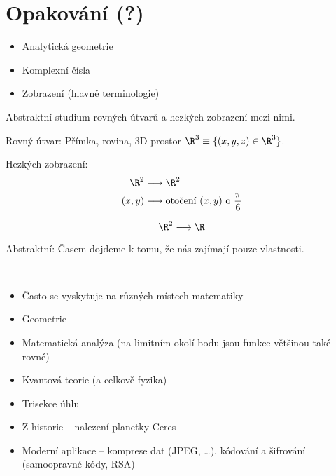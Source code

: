 \documentclass[12pt]{article}					%
\begin{document}
\section{Opakování (?)}
    \begin{itemize}
        \item Analytická geometrie
        \item Komplexní čísla
        \item Zobrazení (hlavně terminologie)
    \end{itemize}
    \begin{poznamka}
        Abstraktní studium rovných útvarů a hezkých zobrazení mezi nimi.

        Rovný útvar: Přímka, rovina, 3D prostor $\R^3 \equiv \{(x, y, z)\in \R^3\}$.

        Hezkých zobrazení: 
        \begin{align}
            \R^2 & \longrightarrow \R^2 \\
            (x, y) & \longrightarrow \text{otočení }(x, y)\text{ o }\frac{\pi}{6}
        \end{align}

        $$ \R^2 \longrightarrow \R $$

        Abstraktní: Časem dojdeme k tomu, že nás zajímají pouze vlastnosti.
    \end{poznamka}
    \begin{poznamka}
        \ 
        \begin{itemize}
            \item Často se vyskytuje na různých místech matematiky
            \item Geometrie
            \item Matematická analýza (na limitním okolí bodu jsou funkce většinou také rovné)
            \item Kvantová teorie (a celkově fyzika)
            \item Trisekce úhlu
            \item Z historie -- nalezení planetky Ceres
            \item Moderní aplikace -- komprese dat (JPEG, …), kódování a šifrování (samoopravné kódy, RSA)
        \end{itemize}
        
    \end{poznamka}
\end{document}
